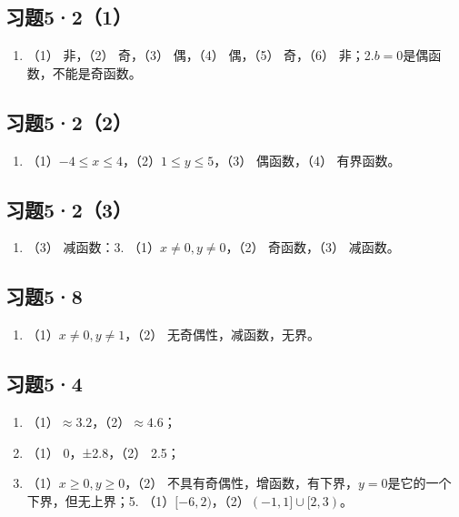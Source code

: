 \subsection{习题5·2（1）}

\begin{enumerate}
\item
  （1） 非，（2） 奇，（3） 偶，（4） 偶，（5） 奇，（6）
  非；2.\(b = 0\)是偶函数，不能是奇函数。
\end{enumerate}

\subsection{习题5·2（2）}

\begin{enumerate}[start=2]
\item
  （1）\(-4 \leqslant x \leqslant 4\)，（2）\(1 \leqslant y \leqslant 5\)，（3）
  偶函数，（4） 有界函数。
\end{enumerate}

\subsection{习题5·2（3）}

\begin{enumerate}[start=2]
\item
  （3） 减函数：3. （1）\(x \neq 0, y \neq 0\)，（2） 奇函数，（3）
  减函数。
\end{enumerate}

\subsection{习题5·8}

\begin{enumerate}
\item
  （1）\(x \neq 0, y \neq 1\)，（2） 无奇偶性，减函数，无界。
\end{enumerate}

\subsection{习题5·4}

\begin{enumerate}
\item
  （1）\(\approx 3.2\)，（2）\(\approx 4.6\)；
\item
  （1） 0，±2.8，（2） 2.5；
\item
  （1）\(x \geqslant 0, y \geqslant 0\)，（2）
  不具有奇偶性，增函数，有下界，\(y = 0\)是它的一个下界，但无上界；5.
  （1）\([-6, 2)\)，（2）\((-1, 1] \cup [2, 3)\)。
\end{enumerate}

